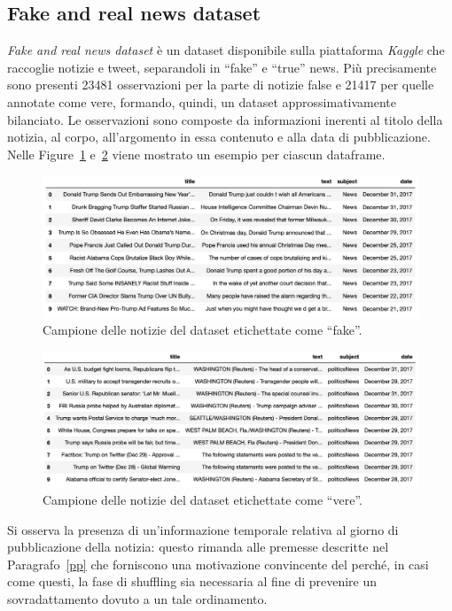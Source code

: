 \documentclass[12pt]{report}
\theoremstyle{definition}
\begin{document}
\subsection{Fake and real news dataset}\label{fakenewsdataset}
\textit{Fake and real news dataset} è un dataset disponibile sulla piattaforma \textit{Kaggle} che raccoglie notizie e tweet, separandoli in ``fake'' e ``true'' news. Più precisamente sono presenti 23481 osservazioni per la parte di notizie false e 21417 per quelle annotate come vere, formando, quindi, un dataset approssimativamente bilanciato. 
Le osservazioni sono composte da informazioni inerenti al titolo della notizia, al corpo, all'argomento in essa contenuto e alla data di pubblicazione. Nelle Figure~\ref{fake_sample} e~\ref{true_sample} viene mostrato un esempio per ciascun dataframe.
\begin{figure}
    \centering
    \includegraphics[scale=0.52]{images/fake_sample.png}
    \caption{Campione delle notizie del dataset etichettate come ``fake''.}
    \label{fake_sample}
\end{figure}
\begin{figure}
    \centering
    \includegraphics[scale=0.5]{images/true_sample.png}
    \caption{Campione delle notizie del dataset etichettate come ``vere''.}
    \label{true_sample}
\end{figure}
Si osserva la presenza di un'informazione temporale relativa al giorno di pubblicazione della notizia: questo rimanda alle premesse descritte nel Paragrafo~\ref{pp} che forniscono una motivazione convincente del perché, in casi come questi, la fase di shuffling sia necessaria al fine di prevenire un sovradattamento dovuto a un tale ordinamento.
\end{document}
